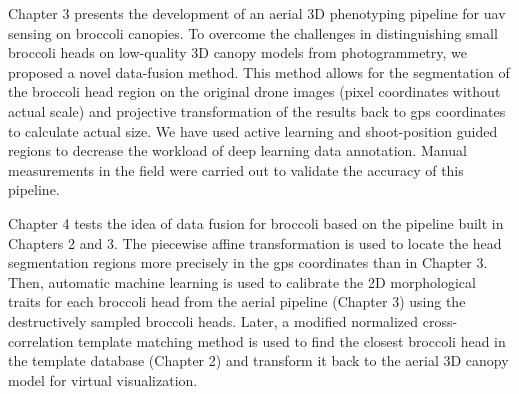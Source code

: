 
Chapter 3 presents the development of an aerial 3D phenotyping pipeline for \gls{uav} sensing on broccoli canopies. To overcome the challenges in distinguishing small broccoli heads on low-quality 3D canopy models from photogrammetry, we proposed a novel data-fusion method. This method allows for the segmentation of the broccoli head region on the original drone images (pixel coordinates without actual scale) and projective transformation of the results back to \gls{gps} coordinates to calculate actual size. We have used active learning and shoot-position guided regions to decrease the workload of deep learning data annotation. Manual measurements in the field were carried out to validate the accuracy of this pipeline.



Chapter 4 tests the idea of data fusion for broccoli based on the pipeline built in Chapters 2 and 3. The piecewise affine transformation is used to locate the head segmentation regions more precisely in the \gls{gps}  coordinates than in Chapter 3. Then, automatic machine learning is used to calibrate the 2D morphological traits for each broccoli head from the aerial pipeline (Chapter 3) using the destructively sampled broccoli heads. Later, a modified normalized cross-correlation template matching method is used to find the closest broccoli head in the template database (Chapter 2) and transform it back to the aerial 3D canopy model for virtual visualization.

